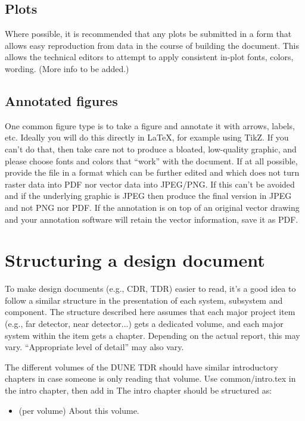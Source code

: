 \subsection{Plots}
\label{sec:plots}

Where possible, it is recommended that any plots be submitted in a
form that allows easy reproduction from data in the course of building
the document.
This allows the technical editors to attempt to apply consistent
in-plot fonts, colors, wording.
(More info to be added.)

\subsection{Annotated figures}
\label{sec:annotate}

One common figure type is to take a figure and annotate it with
arrows, labels, etc.
Ideally you will do this directly in \LaTeX{}, for example using TikZ.
If you can't do that, then take care not to produce a bloated,
low-quality graphic, and please choose fonts and colors that ``work''
with the document.
If at all possible, provide the file in a format which can be further
edited and which does not turn raster data into PDF nor vector data
into JPEG/PNG.
If this can't be avoided and if the underlying graphic is JPEG then
produce the final version in JPEG and not PNG nor PDF.
If the annotation is on top of an original vector drawing and your
annotation software will retain the vector information, save it as
PDF.

\section{Structuring a design document}
\label{sec:design-doc}

To make design documents (e.g., CDR, TDR) easier to read, it's a good idea to follow a similar structure in the presentation of each system, subsystem and component. The structure described here assumes that each major project item (e.g., far detector, near detector...) gets a dedicated volume, and each major system within the item gets a chapter.  Depending on the actual report, this may vary. ``Appropriate level of detail'' may also vary.

The different volumes of the DUNE TDR should have similar introductory chapters in case someone is only reading that volume. 
Use common/intro.tex in the intro chapter, then add in 
The intro chapter should be structured as:
\begin{itemize}
\item (per volume) About this volume.
\end{itemize}

